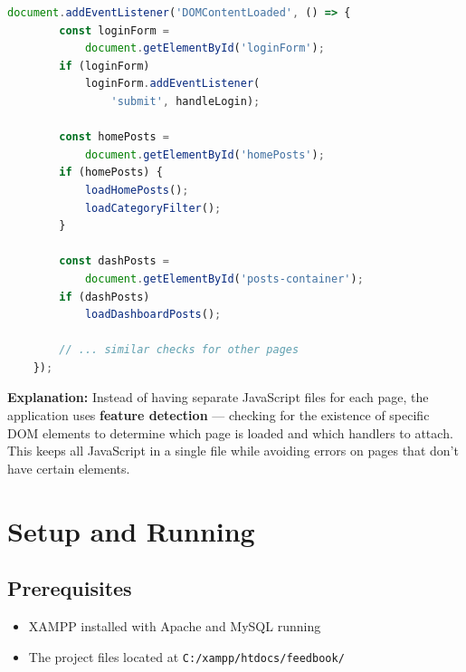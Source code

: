 \documentclass[12pt,a4paper]{report}
\begin{document}
\begin{lstlisting}[language=JavaScript]
    document.addEventListener('DOMContentLoaded', () => {
        const loginForm =
            document.getElementById('loginForm');
        if (loginForm)
            loginForm.addEventListener(
                'submit', handleLogin);

        const homePosts =
            document.getElementById('homePosts');
        if (homePosts) {
            loadHomePosts();
            loadCategoryFilter();
        }

        const dashPosts =
            document.getElementById('posts-container');
        if (dashPosts)
            loadDashboardPosts();

        // ... similar checks for other pages
    });
\end{lstlisting}

\textbf{Explanation:} Instead of having separate JavaScript files for each page, the application uses \textbf{feature detection} --- checking for the existence of specific DOM elements to determine which page is loaded and which handlers to attach. This keeps all JavaScript in a single file while avoiding errors on pages that don't have certain elements.


\chapter{Setup and Running}

\section{Prerequisites}
\begin{itemize}
    \item XAMPP installed with Apache and MySQL running
    \item The project files located at \texttt{C:/xampp/htdocs/feedbook/}
\end{itemize}
\end{document}
